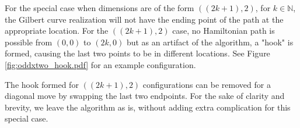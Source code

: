For the special case when dimensions are of the form $((2k+1),2)$, for $k \in \mathbb{N}$, the Gilbert curve realization will
not have the ending point of the path at the appropriate location.
For the $((2k+1),2)$ case, no Hamiltonian path is possible from $(0,0)$ to $(2k,0)$ but as an artifact of the algorithm,
a "hook" is formed, causing the last two points to be in different locations.
See Figure \ref{fig:oddxtwo_hook.pdf} for an example configuration.

The hook formed for $((2k+1),2)$ configurations can be removed for a diagonal move by swapping the last two endpoints.
For the sake of clarity and brevity, we leave the algorithm as is, without adding extra complication for this special case.


